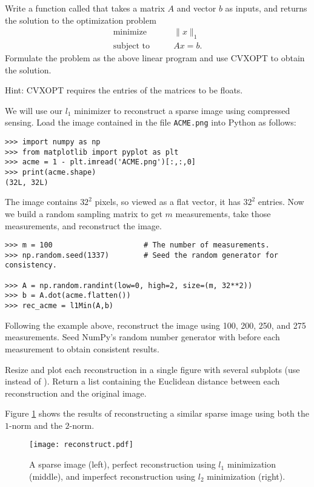 \begin{problem}
Write a function called  that takes a matrix $A$ and vector $b$ as inputs, and returns the solution to the optimization problem 
\begin{align*}
\text{minimize}\qquad &\|x\|_1\\
\text{subject to} \qquad &Ax = b.
\end{align*}
Formulate the problem as the above linear program and use CVXOPT to obtain the solution.

Hint: CVXOPT requires the entries of the matrices to be floats.
\end{problem}

We will use our $l_1$ minimizer to reconstruct a sparse image using compressed sensing.
Load the image contained in the file \texttt{ACME.png} into Python as follows:
\begin{lstlisting}
>>> import numpy as np
>>> from matplotlib import pyplot as plt
>>> acme = 1 - plt.imread('ACME.png')[:,:,0]
>>> print(acme.shape)
(32L, 32L)
\end{lstlisting}
The image contains $32^2$ pixels, so viewed as a flat vector, it has $32^2$ entries.
Now we build a random sampling matrix to get $m$ measurements, take those measurements, and reconstruct the image.
\begin{lstlisting}
>>> m = 100                     # The number of measurements.
>>> np.random.seed(1337)        # Seed the random generator for consistency.

>>> A = np.random.randint(low=0, high=2, size=(m, 32**2))
>>> b = A.dot(acme.flatten())
>>> rec_acme = l1Min(A,b)
\end{lstlisting}

\begin{problem}
Following the example above, reconstruct the image using 100, 200, 250, and 275 measurements.
Seed NumPy's random number generator with  before each measurement to obtain consistent results.

Resize and plot each reconstruction in a single figure with several subplots (use  instead of ).
Return a list containing the Euclidean distance between each reconstruction and the original image.
\end{problem}

Figure \ref{fig:reconstruct} shows the results of reconstructing a similar sparse image using both the $1$-norm and 
the $2$-norm.

\begin{figure}
\centering
\texttt{[image: reconstruct.pdf]}
\caption{A sparse image (left), perfect reconstruction using $l_1$ minimization (middle),  and
imperfect reconstruction using $l_2$ minimization (right).}
\label{fig:reconstruct}
\end{figure}
